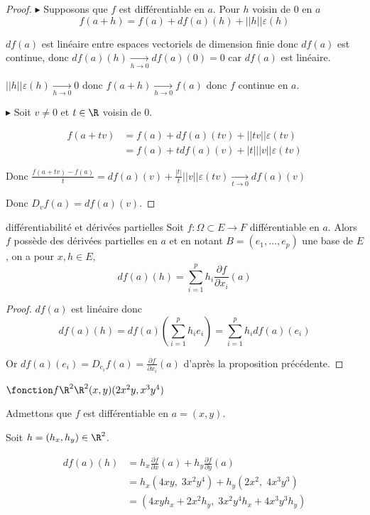 \begin{proof}
    $\blacktriangleright$ Supposons que $f$ est différentiable en $a$. Pour $h$ voisin de $0$ en $a$ 
    $$f(a + h) = f(a) + df(a)(h)+ ||h|| \varepsilon (h)$$

    $df(a)$ est linéaire entre espaces vectoriels de dimension finie donc $df(a)$ est continue, 
    donc $df(a)(h) \xrightarrow[h \to 0]{} df(a)(0) = 0$ car $df(a)$ est linéaire. 

    $||h|| \varepsilon(h) \xrightarrow[h \to 0 ]{} 0$ donc $f(a + h) \xrightarrow[h \to 0 ]{} f(a)$
    donc $f$ continue en $a$. 

    \lvspace 
    
    $\blacktriangleright$ Soit $v \neq 0$ et $t \in \R$ voisin de 0. 

    \begin{align}
        f(a + tv) &= f(a) + df(a)(tv) + ||tv|| \varepsilon (tv) \\
        &= f(a) + t df(a)(v) + |t| ||v|| \varepsilon (tv)
    \end{align}

    Donc  $\displaystyle \frac{f(a + tv) - f(a)}{t} = df(a)(v) + \frac{|t|}{t} ||v|| \varepsilon (tv) \xrightarrow[t \to 0 ]{} df(a)(v)$

    Donc $D_vf(a) = df(a)(v)$.
\end{proof}

\begin{corollaire}{différentiabilité et dérivées partielles}{}
    Soit $f : \Omega \subset E \to F$ différentiable en $a$. Alors $f$ possède des dérivées 
    partielles en $a$ et en notant $B = (e_1, \ldots, e_p)$ une base de $E$, on a pour $x, h \in E$,
    $$df(a)(h) = \sum_{i = 1 }^{p } h_i \frac{\partial f}{\partial x_i} (a)$$
\end{corollaire}

\begin{proof}
    $df(a)$ est linéaire donc 
    $$\displaystyle df(a)(h) = df(a)\left(\sum_{i = 1 }^{p } h_i e_i\right) = \sum_{i = 1 }^{p } h_i df(a)(e_i)$$

    Or $\displaystyle df(a)(e_i) = D_{e_i} f(a) = \frac{\partial f}{\partial x_i} (a)$ d'après la proposition précédente.
\end{proof}

\begin{exemple}
    $\fonction f {\R^2}{\R^2}{(x, y)}{(2 x^2y, x^3 y^4)}$

    Admettons que $f$ est différentiable en $a = (x, y)$. 

    Soit $h = (h_x, h_y) \in \R^2$.

    \begin{align}
        df(a)(h) & = h_x \frac{\partial f}{\partial x} (a) + h_y \frac{\partial f}{\partial y} (a) \\
        & = h_x (4 x y, \; 3 x^2 y^4) + h_y (2 x^2, \; 4 x^3 y^3) \\
        & = (4 x y h_x + 2 x^2 h_y, \; 3 x^2 y^4 h_x + 4 x^3 y^3 h_y)
    \end{align}
\end{exemple}

